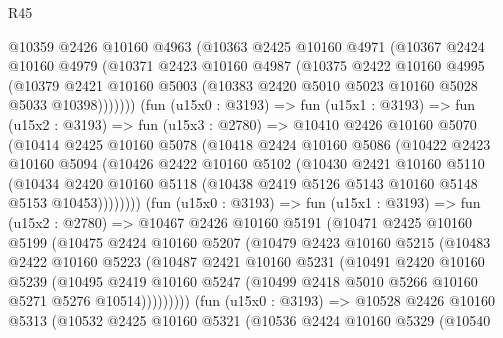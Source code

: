 \begin{lexlean}{R45}
\begin{coremodule}
        @10359
          @2426
          @10160
          @4963
          (@10363
            @2425
            @10160
            @4971
            (@10367
              @2424
              @10160
              @4979
              (@10371
                @2423
                @10160
                @4987
                (@10375
                  @2422
                  @10160
                  @4995
                  (@10379
                    @2421
                    @10160
                    @5003
                    (@10383 @2420 @5010 @5023 @10160 @5028 @5033 @10398)))))))
        (fun (u15x0 : @3193) =>
        fun (u15x1 : @3193) =>
        fun (u15x2 : @3193) =>
        fun (u15x3 : @2780) =>
        @10410
          @2426
          @10160
          @5070
          (@10414
            @2425
            @10160
            @5078
            (@10418
              @2424
              @10160
              @5086
              (@10422
                @2423
                @10160
                @5094
                (@10426
                  @2422
                  @10160
                  @5102
                  (@10430
                    @2421
                    @10160
                    @5110
                    (@10434
                      @2420
                      @10160
                      @5118
                      (@10438 @2419 @5126 @5143 @10160 @5148 @5153 @10453))))))))
        (fun (u15x0 : @3193) =>
        fun (u15x1 : @3193) =>
        fun (u15x2 : @2780) =>
        @10467
          @2426
          @10160
          @5191
          (@10471
            @2425
            @10160
            @5199
            (@10475
              @2424
              @10160
              @5207
              (@10479
                @2423
                @10160
                @5215
                (@10483
                  @2422
                  @10160
                  @5223
                  (@10487
                    @2421
                    @10160
                    @5231
                    (@10491
                      @2420
                      @10160
                      @5239
                      (@10495
                        @2419
                        @10160
                        @5247
                        (@10499 @2418 @5010 @5266 @10160 @5271 @5276 @10514)))))))))
        (fun (u15x0 : @3193) =>
        @10528
          @2426
          @10160
          @5313
          (@10532
            @2425
            @10160
            @5321
            (@10536
              @2424
              @10160
              @5329
              (@10540

\end{coremodule}
\end{lexlean}

